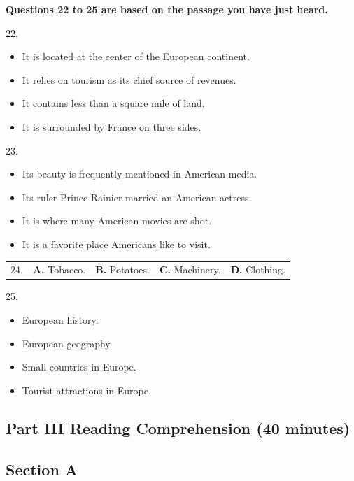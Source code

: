 \documentclass[UTF8,11pt]{ctexart}
\begin{document}
\textbf{Questions 22 to 25 are based on the passage you have just heard.}


22.


\begin{itemize}[leftmargin=2em,itemsep=.2em,topsep=.4em]\item[A.] It is located at the center of the European continent.
\item[B.] It relies on tourism as its chief source of revenues.
\item[C.] It contains less than a square mile of land.
\item[D.] It is surrounded by France on three sides.
\end{itemize}

23.


\begin{itemize}[leftmargin=2em,itemsep=.2em,topsep=.4em]\item[A.] Its beauty is frequently mentioned in American media.
\item[B.] Its ruler Prince Rainier married an American actress.
\item[C.] It is where many American movies are shot.
\item[D.] It is a favorite place Americans like to visit.
\end{itemize}

\noindent\begin{tabularx}{\linewidth}{@{}lXXXX@{}}24. & \textbf{A.} Tobacco. & \textbf{B.} Potatoes. & \textbf{C.} Machinery. & \textbf{D.} Clothing.\\\end{tabularx}\par

25.


\begin{itemize}[leftmargin=2em,itemsep=.2em,topsep=.4em]\item[A.] European history.
\item[B.] European geography.
\item[C.] Small countries in Europe.
\item[D.] Tourist attractions in Europe.
\end{itemize}

\subsection*{\textbf{Part} III \textbf{Reading Comprehension} \textbf{(40 minutes)}}


\subsection*{\textbf{Section A}}
\end{document}

